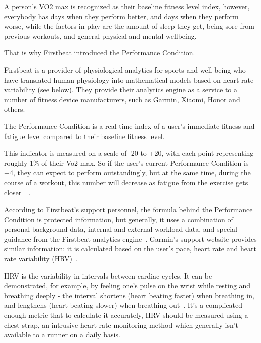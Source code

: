 A person's VO2 max is recognized as their baseline fitness level index, however, everybody has days when they perform better, and days when they perform worse, while the factors in play are the amount of sleep they get, being sore from previous workouts, and general physical and mental wellbeing.

That is why Firstbeat introduced the Performance Condition.

Firstbeat is a provider of physiological analytics for sports and well-being who have translated human physiology into mathematical models based on heart rate variability (see below).
They provide their analytics engine as a service to a number of fitness device manufacturers, such as Garmin, Xiaomi, Honor and others.

The Performance Condition is a real-time index of a user's immediate fitness and fatigue level compared to their baseline fitness level.

This indicator is measured on a scale of -20 to +20, with each point representing roughly 1\% of their Vo2 max.
So if the user's current Performance Condition is +4, they can expect to perform outstandingly,
but at the same time, during the course of a workout, this number will decrease as fatigue from the exercise gets closer~\cite{performance-condition-firstbeat}~\cite{performance-condition-garmin}.

According to Firstbeat's support personnel, the formula behind the Performance Condition is protected information,
but generally, it uses a combination of personal background data, internal and external workload data, and special guidance from the Firstbeat analytics engine~\cite{firstbeat-performance-condition-emails}.
Garmin's support website provides similar information: it is calculated based on the user's pace, heart rate and heart rate variability (HRV)~\cite{performance-condition-garmin}.

HRV is the variability in intervals between cardiac cycles.
It can be demonstrated, for example, by feeling one's pulse on the wrist while resting and breathing deeply - the interval shortens (heart beating faster) when breathing in, and lengthens (heart beating slower) when breathing out~\cite{hrv}.
It's a complicated enough metric that to calculate it accurately, HRV should be measured using a chest strap,
an intrusive heart rate monitoring method which generally isn't available to a runner on a daily basis.

